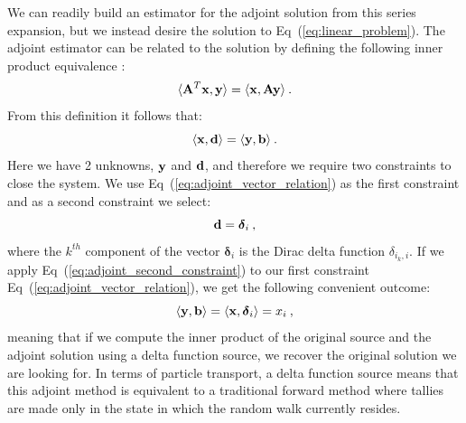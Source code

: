 \documentclass{mc2013}
\begin{document}
We can readily build an estimator for the adjoint solution from this
series expansion, but we instead desire the solution to
Eq~(\ref{eq:linear_problem}). The adjoint estimator can be related to
the solution by defining the following inner product equivalence
\cite{spanier_monte_1969}:
\begin{equation}
  \langle \mathbf{A}^T \mathbf{x}, \mathbf{y} \rangle = \langle \mathbf{x}, \mathbf{A}
  \mathbf{y} \rangle\:.
  \label{eq:adjoint_operator_product}
\end{equation}
From this definition it follows that:
\begin{equation}
  \langle \mathbf{x}, \mathbf{d} \rangle = \langle \mathbf{y}, \mathbf{b} \rangle\:.
  \label{eq:adjoint_vector_relation}
\end{equation}
Here we have 2 unknowns, $\mathbf{y}$ and $\mathbf{d}$, and therefore we
require two constraints to close the system. We use
Eq~(\ref{eq:adjoint_vector_relation}) as the first constraint and as a
second constraint we select:
\begin{equation}
  \mathbf{d} = \boldsymbol{\delta}_i\:,
  \label{eq:adjoint_second_constraint}
\end{equation}
where the $k^{th}$ component of the vector $\boldsymbol{\delta}_i$ is
the Dirac delta function $\delta_{i_k,i}$. If we apply
Eq~(\ref{eq:adjoint_second_constraint}) to our first constraint
Eq~(\ref{eq:adjoint_vector_relation}), we get the following convenient
outcome:
\begin{equation}
  \langle \mathbf{y}, \mathbf{b} \rangle = \langle \mathbf{x},
  \boldsymbol{\delta}_i \rangle = x_i \:,
  \label{eq:inner_product_constraint}
\end{equation}
meaning that if we compute the inner product of the original source and
the adjoint solution using a delta function source, we recover the
original solution we are looking for. In terms of particle transport, a
delta function source means that this adjoint method is equivalent to
a traditional forward method where tallies are made only in the state
in which the random walk currently resides.
\end{document}
